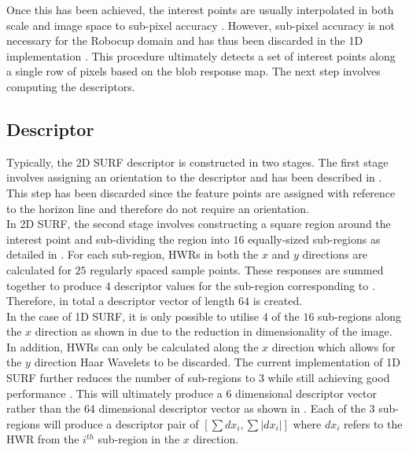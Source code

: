 \documentclass[11pt]{report}
\begin{document}
Once this has been achieved, the interest points are usually interpolated in both scale and image space to sub-pixel accuracy \cite{Evans2009}. However, sub-pixel accuracy is not necessary for the Robocup domain and has thus been discarded in the 1D implementation \cite{Anderson}. This procedure ultimately detects a set of interest points along a single row of pixels based on the blob response map. The next step involves computing the descriptors.\\  

\subsection{Descriptor}
\label{sec:1dsurfDescribe}
Typically, the 2D SURF descriptor is constructed in two stages. The first stage involves assigning an orientation to the descriptor and has been described in . This step has been discarded since the feature points are assigned with reference to the horizon line and therefore do not require an orientation.\\

In 2D SURF, the second stage involves constructing a square region around the interest point and sub-dividing the region into $16$ equally-sized sub-regions as detailed in . For each sub-region, HWRs in both the $x$ and $y$ directions are calculated for $25$ regularly spaced sample points. These responses are summed together to produce $4$ descriptor values for the sub-region corresponding to . Therefore, in total a descriptor vector of length $64$ is created.\\

In the case of 1D SURF, it is only possible to utilise $4$ of the $16$ sub-regions along the $x$ direction as shown in  due to the reduction in dimensionality of the image. In addition, HWRs can only be calculated along the $x$ direction which allows for the $y$ direction Haar Wavelets to be discarded. The current implementation of 1D SURF further reduces the number of sub-regions to $3$ while still achieving good performance \cite{Anderson}. This will ultimately produce a $6$ dimensional descriptor vector rather than the $64$ dimensional descriptor vector as shown in . Each of the $3$ sub-regions will produce a descriptor pair of $[\sum dx_i, \sum |dx_i|]$ where $dx_i$ refers to the HWR from the $i^{th}$ sub-region in the $x$ direction. \\
\end{document}
